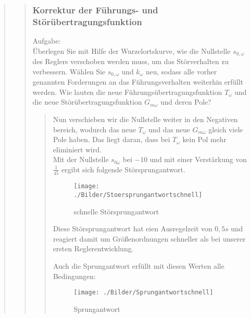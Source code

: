 \begin{quote}
\begin{quote}
\begin{quote}
            
		\end{quote}
		
		\subsubsection{Korrektur der Führungs- und Störübertragungsfunktion}
		\label{2f}
		Aufgabe:\\
	    Überlegen Sie mit Hilfe der Wurzelortskurve, wie die Nullstelle $s_{0,\omega}$ des Reglers verschoben werden muss, um
	    das Störverhalten zu verbessern. Wählen Sie $s_{0,\omega}$ und $k_\omega$ neu, sodass alle vorher genannten
	    Forderungen an das Führungsverhalten weiterhin erfüllt werden. Wie lauten die neue
	    Führungsübertragungsfunktion $T_\omega$ und die neue Störübertragungsfunktion $G_{m\omega}$ und deren Pole?
		\begin{quote}
		\vspace{1em}
        Nun verschieben wir die Nullstelle weiter in den Negativen bereich, wodurch das neue $T_\omega$ und das neue $G_{m\omega}$ gleich
        viele Pole haben. Das liegt daran, dass bei $T_\omega$ kein Pol mehr eliminiert wird.\\
        Mit der Nullstelle $s_{0\omega}$ bei $-10$ und mit einer Verstärkung von $\frac{1}{45}$ ergibt sich folgende
        Störsprungantwort.
			
			\begin{figure}[H]
            \centering
                \texttt{[image: ./Bilder/Stoersprungantwortschnell]}
                    \caption{schnelle Störsprungantwort}
                    \label{fig:Stoersprungantwortschnell}
            \end{figure}
            
            Diese Störsprungantwort hat eien Ausregelzeit von $0,5s$ und reagiert damit um Größenordnungen schneller
            als bei unserer ersten Reglerentwicklung.\vspace{1em}
            
            Auch die Sprungantwort erfüllt mit diesen Werten alle Bedingungen:
            \begin{figure}[H]
            \centering
                \texttt{[image: ./Bilder/Sprungantwortschnell]}
                    \caption{Sprungantwort}
                    \label{fig:./Bilder/Sprungantwortschnell}
            \end{figure}
    

\end{quote}
\end{quote}
\end{quote}

